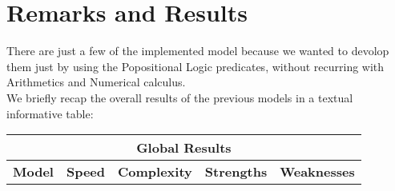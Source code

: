 \section{Remarks and Results}
There are just a few of the implemented model because we wanted to devolop them just by using the Popositional Logic predicates, without recurring with Arithmetics
and Numerical calculus.\\

We briefly recap the overall results of the previous models in a textual informative table:

\begin{center}
    \begin{adjustwidth}{-1.5cm}{}
        \begin{tabular}{|c|c|c|c|c|}
            \hline
            \multicolumn{5}{|c|}{\textbf{Global Results}} \\
            \hline
            \textbf{Model} & \textbf{Speed} & \textbf{Complexity} & \textbf{Strengths} & \textbf{Weaknesses} \\
            \hline
        \end{tabular}
    \end{adjustwidth}
\end{center}